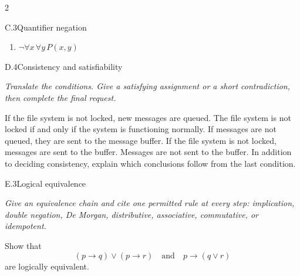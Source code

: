 \documentclass[9pt]{extarticle}
\begin{document}
\begin{multicols}{2}
\begin{CoreProblem}{C.3}{Quantifier negation}
\begin{enumerate}[label=(\alph*)]
  \item $\neg\forall x\,\forall y\,P(x,y)$
\end{enumerate}
\end{CoreProblem}
\columnbreak
\begin{CoreProblem}{D.4}{Consistency and satisfiability}
{\scriptsize\textit{Translate the conditions. Give a satisfying assignment or a short contradiction, then complete the final request.}\par}
If the file system is not locked, new messages are queued. The file system is
not locked if and only if the system is functioning normally. If messages are
not queued, they are sent to the message buffer. If the file system is not
locked, messages are sent to the buffer. Messages are not sent to the buffer.
In addition to deciding consistency, explain which conclusions follow from the
last condition.
\end{CoreProblem}
\begin{CoreProblem}{E.3}{Logical equivalence}
{\scriptsize\textit{Give an equivalence chain and cite one permitted rule at every step: implication, double negation, De Morgan, distributive, associative, commutative, or idempotent.}\par}
Show that
\[
  (p\to q)\lor(p\to r)
  \quad\text{and}\quad
  p\to(q\lor r)
\]
are logically equivalent.
\end{CoreProblem}
\end{multicols}
\CoreWorkArea
\FormBreak
{}
\end{document}
